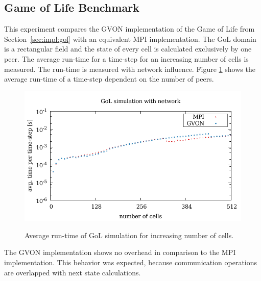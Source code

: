 \subsection{Game of Life Benchmark}
This experiment compares the GVON implementation of the Game of Life
from Section~\ref{sec:impl:gol} with an equivalent MPI
implementation. The GoL domain is a rectangular field and the state of
every cell is calculated exclusively by one peer. The average run-time
for a time-step for an increasing number of cells is measured. The
run-time is measured with network influence.  Figure
\ref{fig:gol_laser} shows the average run-time of a time-step
dependent on the number of peers.

\begin{figure}[H]
    \includegraphics[width=\textwidth]{plots/50_gol_network_laser}
  \label{fig:gol_laser}
  \caption{Average run-time of GoL simulation for increasing number
    of cells.}
\end{figure}

\noindent The GVON implementation shows no overhead in comparison to
the MPI implementation. This behavior was expected, because
communication operations are overlapped with next state calculations.


